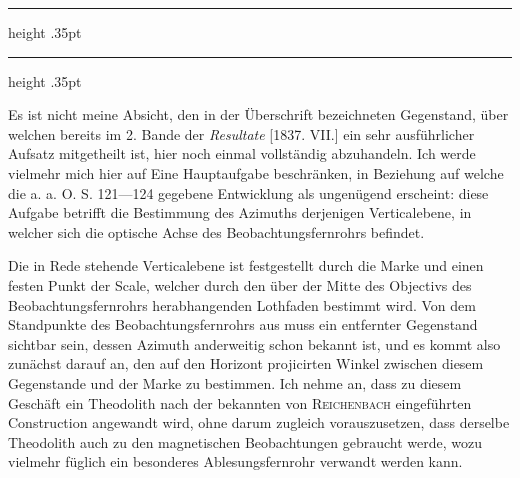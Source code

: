 \clearpage
{}
\GaussVSourceUnnumbered{}
\vspace*{.58in}
\begin{center}
\par
\vspace{.7\baselineskip}
\par
\vspace{.95\baselineskip}
\parbox{.78\linewidth}{
  \centering
  \hrule height .35pt
  \vspace{4pt}
  \par
  \vspace{4pt}
  \hrule height .35pt
}
\end{center}

Es ist nicht meine Absicht, den in der Überschrift bezeichneten Gegenstand, über welchen bereits im 2. Bande der \textit{Resultate} [1837. VII.] ein sehr ausführlicher Aufsatz mitgetheilt ist, hier noch einmal vollständig abzuhandeln. Ich werde vielmehr mich hier auf Eine Hauptaufgabe beschränken, in Beziehung auf welche die a. a. O. S. 121—124 gegebene Entwicklung als ungenügend erscheint: diese Aufgabe betrifft die Bestimmung des Azimuths derjenigen Verticalebene, in welcher sich die optische Achse des Beobachtungsfernrohrs befindet.

Die in Rede stehende Verticalebene ist festgestellt durch die Marke und einen festen Punkt der Scale, welcher durch den über der Mitte des Objectivs des Beobachtungsfernrohrs herabhangenden Lothfaden bestimmt wird. Von dem Standpunkte des Beobachtungsfernrohrs aus muss ein entfernter Gegenstand sichtbar sein, dessen Azimuth anderweitig schon bekannt ist, und es kommt also zunächst darauf an, den auf den Horizont projicirten Winkel zwischen diesem Gegenstande und der Marke zu bestimmen. Ich nehme an, dass zu diesem Geschäft ein Theodolith nach der bekannten von \textsc{Reichenbach} eingeführten Construction angewandt wird, ohne darum zugleich vorauszusetzen, dass derselbe Theodolith auch zu den magnetischen Beobachtungen gebraucht werde, wozu vielmehr füglich ein besonderes Ablesungsfernrohr verwandt werden kann.

